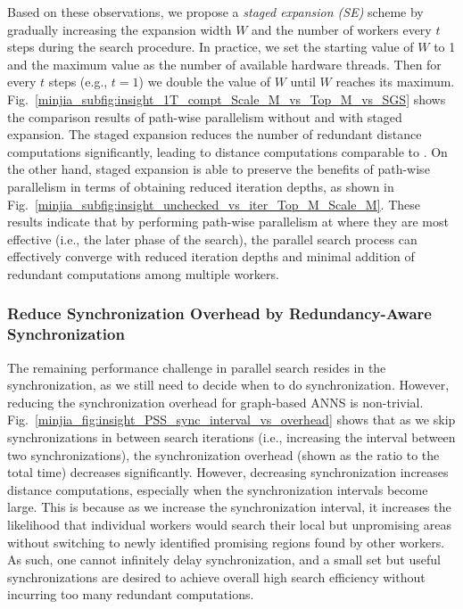 Based on these observations, we propose a \emph{staged expansion (SE)} scheme by gradually increasing the expansion width $W$ and the number of workers every $t$ steps during the search procedure. In practice, we set the starting value of $W$ to 1 and the maximum value as the number of available hardware threads. Then for every $t$ steps (e.g., $t=1$) we double the value of $W$ until $W$ reaches its maximum. Fig.~\ref{minjia_subfig:insight_1T_compt_Scale_M_vs_Top_M_vs_SGS} shows the comparison results of path-wise parallelism without and with staged expansion. The staged expansion reduces the number of redundant distance computations significantly, leading to distance computations comparable to \SeqShortName. On the other hand, staged expansion is able to preserve the benefits of path-wise parallelism in terms of obtaining reduced iteration depths, as shown in Fig.~\ref{minjia_subfig:insight_unchecked_vs_iter_Top_M_Scale_M}. These results indicate that by performing path-wise parallelism at where they are most effective (i.e., the later phase of the search), the parallel search process can effectively converge with reduced iteration depths and minimal addition of redundant computations among multiple workers.

\subsubsection{Reduce Synchronization Overhead by Redundancy-Aware Synchronization}

The remaining performance challenge in parallel search resides in the synchronization, as we still need to decide when to do synchronization. However, reducing the synchronization overhead for graph-based ANNS is non-trivial.
Fig.~\ref{minjia_fig:insight_PSS_sync_interval_vs_overhead} shows that as we skip synchronizations in between search iterations (i.e., increasing the interval between two synchronizations), the synchronization overhead (shown as the ratio to the total time) decreases significantly. However, decreasing synchronization increases distance computations, especially when the synchronization intervals become large. This is because as we increase the synchronization interval, it increases the likelihood that individual workers would search their local but unpromising areas without switching to newly identified promising regions found by other workers. As such, one cannot infinitely delay synchronization, and a small set but useful synchronizations are desired to achieve overall high search efficiency without incurring too many redundant computations.  


